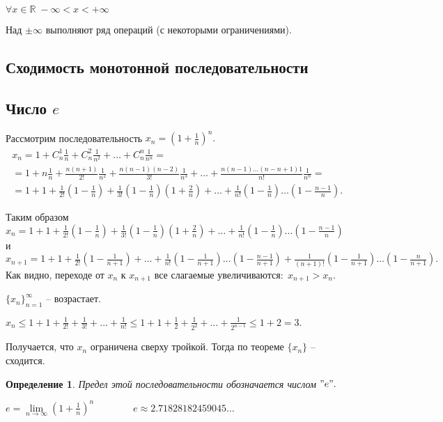 \documentclass{article}
\newtheorem{Definition}{Определение}[section]
\begin{document}
$\forall x\in\mathbb{R} \; -\infty<x<+\infty$

Над $\pm\infty$ выполняют ряд операций (с некоторыми ограничениями).

\subsection{Сходимость монотонной последовательности}

\subsection{Число $e$}
Рассмотрим последовательность $x_n=\left(1+\frac{1}{n}\right)^n.$
\begin{eqnarray}
\nonumber x_n=1+C_n^1\frac{1}{n}+C_n^2\frac{1}{n^2}+\ldots+C_n^n\frac{1}{n^n} = \qquad\qquad\qquad\qquad\qquad\qquad\qquad\qquad\;\;\;\quad\quad\\ \nonumber
=1+n\frac{1}{n}+\frac{n(n+1)}{2!}\frac{1}{n^2}+\frac{n(n-1)(n-2)}{3!}\frac{1}{n^3}+\ldots+\frac{n(n-1)\ldots(n-n+1)1}{n!}\frac{1}{n^n}=\\ \nonumber
=1+1+\frac{1}{2!}\left(1-\frac{1}{n}\right)+\frac{1}{3!}\left(1-\frac{1}{n}\right)\left(1+\frac{2}{n}\right)+\ldots+\frac{1}{n!}\left(1-\frac{1}{n}\right)\ldots\left(1-\frac{n-1}{n}\right).
\end{eqnarray}

Таким образом $x_n=1+1+\frac{1}{2!}\left(1-\frac{1}{n}\right)+\frac{1}{3!}\left(1-\frac{1}{n}\right)\left(1+\frac{2}{n}\right)+\ldots+\frac{1}{n!}\left(1-\frac{1}{n}\right)\ldots\left(1-\frac{n-1}{n}\right)$\\


и $x_{n+1}=1+1+\frac{1}{2!}\left(1-\frac{1}{n+1}\right)+\ldots+\frac{1}{n!}\left(1-\frac{1}{n+1}\right)\ldots\left(1-\frac{n-1}{n+1}\right)+\frac{1}{(n+1)!}\left(1-\frac{1}{n+1}\right)\ldots\left(1-\frac{n}{n+1}\right).$\\

Как видно, переходе от $x_n$ к $x_{n+1}$ все слагаемые увеличиваются$: \; x_{n+1}>x_n.$

$\{x_n\}_{n=1}^{\infty}$ -- возрастает.

$x_n\leq 1+1+\frac{1}{2!}+\frac{1}{3!}+\ldots+\frac{1}{n!}\leq 1+1+\frac{1}{2}+\frac{1}{2^2}+\ldots+\frac{1}{2^{n-1}}\leq 1+2=3.$

Получается, что $x_n$ ограничена сверху тройкой. Тогда по теореме %
$\{x_n\}$ -- сходится.

\begin{Definition}
Предел этой последовательности обозначается числом $"e".$

$e=\lim\limits_{n\rightarrow\infty}\left(1+\frac{1}{n}\right)^n \qquad\qquad e\approx 2.71828182459045\ldots$
\end{Definition}
\end{document}
